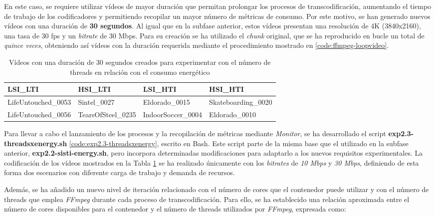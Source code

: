En este caso, se requiere utilizar vídeos de mayor duración que permitan prolongar los procesos de transcodificación, aumentando el tiempo de trabajo de los codificadores y permitiendo recopilar un mayor número de métricas de consumo. Por este motivo, se han generado nuevos vídeos con una duración de \textbf{30 segundos}. Al igual que en la subfase anterior, estos vídeos presentan una resolución de 4K (3840x2160), una tasa de 30 fps y un \textit{bitrate} de 30 Mbps. Para su creación se ha utilizado el \textit{chunk} original, que se ha reproducido en bucle un total de \textit{quince veces}, obteniendo así vídeos con la duración requerida mediante el procedimiento mostrado en \ref{code:ffmpeg-loopvideo}.

\begin{table}[!ht]
 \centering
 \begin{tabularx}{\textwidth}{|X|X|X|X|}
 \hline
 \rowcolor[HTML]{C0C0C0} 
 LSI\_LTI & HSI\_LTI & LSI\_HTI & HSI\_HTI \\ \hline
 LifeUntouched\_0053 & Sintel\_0027 & Eldorado\_0015 & Skateboarding\_0020 \\ \hline
 LifeUntouched\_0056 & TearsOfSteel\_0235 & IndoorSoccer\_0004 & Eldorado\_0010 \\ \hline
 \end{tabularx}
 \caption{Vídeos con una duración de 30 segundos creados para experimentar con el número de threads en relación con el consumo energético}
 \label{tab:exp2.3-videos-30s}
\end{table}

Para llevar a cabo el lanzamiento de los procesos y la recopilación de métricas mediante \textit{Monitor}, se ha desarrollado el script \textbf{exp2.3-threadsxenergy.sh} \ref{code:exp2.3-threadsxenergy}, escrito en Bash. Este script parte de la misma base que el utilizado en la subfase anterior, \textbf{exp2.2-sisti-energy.sh}, pero incorpora determinadas modificaciones para adaptarlo a los nuevos requisitos experimentales. La codificación de los vídeos mostrados en la Tabla \ref{tab:exp2.3-videos-30s} se ha realizado únicamente con los \textit{bitrates} de \textit{10 Mbps} y \textit{30 Mbps}, definiendo de esta forma dos escenarios con diferente carga de trabajo y demanda de recursos.

Además, se ha añadido un nuevo nivel de iteración relacionado con el número de cores que el contenedor puede utilizar y con el número de threads que emplea \textit{FFmpeg} durante cada proceso de transcodificación. Para ello, se ha establecido una relación aproximada entre el número de cores disponibles para el contenedor y el número de threads utilizados por \textit{FFmpeg}, expresada como:

